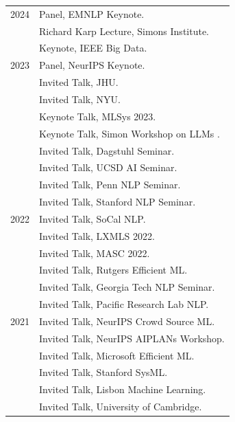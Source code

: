\documentclass[10pt]{article}
\begin{document}
{{{{\bigskip

\medskip
\hspace{-1cm} \begin{tabular}{lp{11.5cm}}
	2024
	 & \ind   Panel, EMNLP Keynote.                         \\
	 & \ind   Richard Karp Lecture, Simons Institute.       \\
	 & \ind   Keynote, IEEE Big Data.                       \\
	2023
	 & \ind   Panel, NeurIPS Keynote.                       \\
	 & \ind   Invited Talk, JHU.                            \\
	 & \ind   Invited Talk, NYU.                            \\
	 & \ind   Keynote Talk, MLSys 2023.                     \\
	 & \ind   Keynote Talk, Simon Workshop on LLMs .        \\
	 & \ind   Invited Talk, Dagstuhl Seminar.               \\
	 & \ind   Invited Talk, UCSD AI Seminar.                \\
	 & \ind   Invited Talk, Penn NLP Seminar.               \\
	 & \ind   Invited Talk, Stanford NLP Seminar.           \\
	2022
	 & \ind   Invited Talk, SoCal NLP.                      \\
	 & \ind   Invited Talk, LXMLS 2022.                     \\
	 & \ind   Invited Talk, MASC 2022.                      \\
	 & \ind   Invited Talk, Rutgers Efficient ML.           \\
	 & \ind   Invited Talk, Georgia Tech NLP Seminar.       \\
	 & \ind   Invited Talk, Pacific Research Lab NLP.       \\
	2021
	 & \ind   Invited Talk, NeurIPS Crowd Source ML.        \\
	 & \ind   Invited Talk, NeurIPS AIPLANs Workshop.       \\
	 & \ind   Invited Talk, Microsoft Efficient ML.         \\
	 & \ind   Invited Talk, Stanford SysML.                 \\
	 & \ind   Invited Talk, Lisbon Machine Learning.        \\
	 & \ind   Invited Talk, University of Cambridge.        \\

\end{tabular}}}}}
\end{document}
